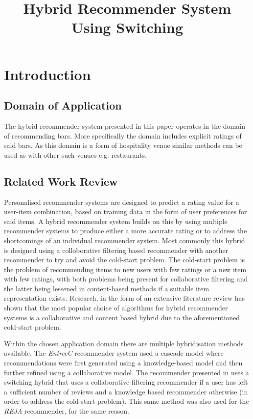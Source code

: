 \documentclass[conference]{IEEEtran}
\begin{document}
\title{Hybrid Recommender System Using Switching}

\author{
}
\maketitle

\section{Introduction}
\subsection{Domain of Application}
The hybrid recommender system presented in this paper operates in the domain of recommending bars. More specifically the domain includes explicit ratings of said bars. As this domain is a form of hospitality venue similar methods can be used as with other such venues e.g. restaurants\cite{b1}.
\subsection{Related Work Review}
Personalised recommender systems are designed to predict a rating value for a user-item combination, based on training data in the form of user preferences for said items\cite{b2}. A hybrid recommender system builds on this by using multiple recommender systems to produce either a more accurate rating or to address the shortcomings of an individual recommender system\cite{b3}. Most commonly this hybrid is designed using a colloborative filtering based recommender with another recommender to try and avoid the cold-start problem\cite{b4}. The cold-start problem is the problem of recommending items to new users with few ratings or a new item with few ratings\cite{b5}, with both problems being present for collaborative filtering and the latter being lessened in content-based methods if a suitable item representation exists\cite{b4}. Research, in the form of an extensive literature review has shown that the most popular choice of algorithms for hybrid recommender systems is a collaborative and content based hybrid due to the aforementioned cold-start problem\cite{b6}. \par Within the chosen application domain there are multiple hybridisation methods available. The \textit{EntreeC} recommender system\cite{b1} used a cascade model where recommendations were first generated using a knowledge-based model and then further refined using a collaborative model. The recommender presented in\cite{b7} uses a switching hybrid that uses a collaborative filtering recommender if a user has left a sufficient number of reviews and a knowledge based recommender otherwise (in order to address the cold-start problem). This same method was also used for the \textit{REJA} recommender, for the same reason\cite{b8}.
\end{document}
